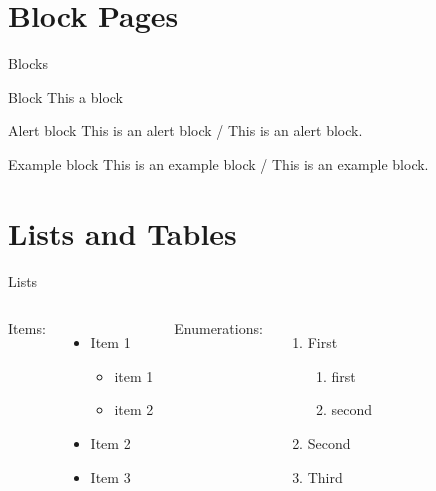 \documentclass{beamer}
\begin{document}
\section{Block Pages}

\begin{frame}{Blocks}
    \begin{block}{Block}
        This a block
    \end{block}
    \pause
    \begin{alertblock}{Alert block}
        This is an alert block / \textcolor{alert}{This is an alert block}.
    \end{alertblock}
    \pause
    \begin{exampleblock}{Example block}
        This is an example block / \textcolor{example}{This is an example block}.
    \end{exampleblock}
\end{frame}

\section{Lists and Tables}

\begin{frame}{Lists}
    \begin{columns}[t, onlytextwidth]
            Items:
            \begin{itemize}
                \item Item 1
                \begin{itemize}
                    \item item 1
                    \item item 2
                \end{itemize}
                \item Item 2
                \item Item 3
            \end{itemize}

            Enumerations:
            \begin{enumerate}
                \item First
                \begin{enumerate}
                    \item first
                    \item second
                \end{enumerate}
                \item Second
                \item Third
            \end{enumerate}
    \end{columns}
\end{frame}
\end{document}
